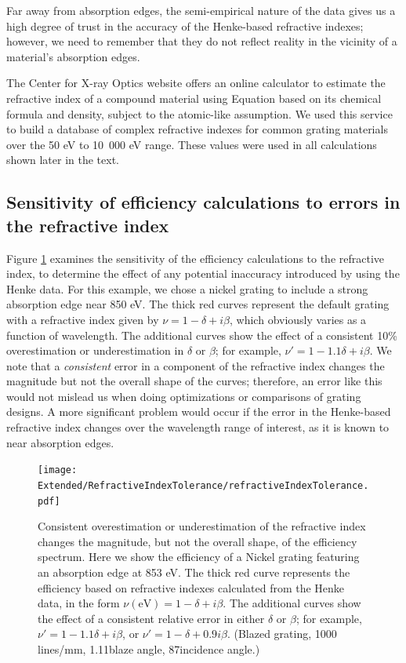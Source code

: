 Far away from absorption edges, the semi-empirical nature of the data gives us a high degree of trust in the accuracy of the Henke-based refractive indexes; however, we need to remember that they do not reflect reality in the vicinity of a material's absorption edges.

The Center for X-ray Optics website \cite{CXR11} offers an online calculator to estimate the refractive index of a compound material using Equation  based on its chemical formula and density, subject to the atomic-like assumption.  We used this service to build a database of complex refractive indexes for common grating materials over the 50 eV to 10~000 eV range.  These values were used in all calculations shown later in the text.

\subsection{Sensitivity of efficiency calculations to errors in the refractive index}
Figure \ref{refractiveIndexTolerance} examines the sensitivity of the efficiency calculations to the refractive index, to determine the effect of any potential inaccuracy introduced by using the Henke data.  For this example, we chose a nickel grating to include a strong absorption edge near 850 eV.  The thick red curves represent the default grating with a refractive index given by $\nu = 1 - \delta + i\beta$, which obviously varies as a function of wavelength.  The additional curves show the effect of a consistent 10\% overestimation or underestimation in $\delta$ or $\beta$; for example, $\nu' = 1 - 1.1\delta + i \beta$.  We note that a \emph{consistent} error in a component of the refractive index changes the magnitude but not the overall shape of the curves; therefore, an error like this would not mislead us when doing optimizations or comparisons of grating designs.  A more significant problem would occur if the error in the Henke-based refractive index changes over the wavelength range of interest, as it is known to near absorption edges.

\begin{figure}[htbp] %
   \centering
   \texttt{[image: Extended/RefractiveIndexTolerance/refractiveIndexTolerance.pdf]} 
   \caption[Consistent overestimation or underestimation of the refractive index changes the magnitude, but not the overall shape, of the efficiency spectrum.]{Consistent overestimation or underestimation of the refractive index changes the magnitude, but not the overall shape, of the efficiency spectrum.  Here we show the efficiency of a Nickel grating featuring an absorption edge at 853 eV.  The thick red curve represents the efficiency based on refractive indexes calculated from the Henke data, in the form $\nu(\textrm{eV}) = 1 - \delta + i\beta$.  The additional curves show the effect of a consistent relative error in either $\delta$ or $\beta$; for example, $\nu' = 1 - 1.1 \delta + i \beta$, or $\nu' = 1 - \delta + 0.9i\beta$.  (Blazed grating, 1000 lines/mm, 1.11\dg  blaze angle, 87\dg  incidence angle.)}
   \label{refractiveIndexTolerance}
\end{figure}